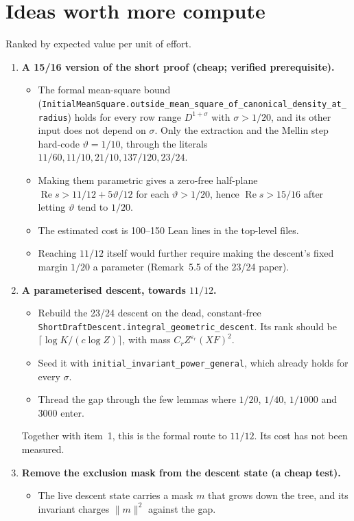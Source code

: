 \documentclass[11pt,a4paper]{article}
\newcommand{\lean}[1]{\nolinkurl{#1}}
\newcommand{\Rea}{\operatorname{Re}}
\begin{document}
\section{Ideas worth more compute}\label{sec:leads}
Ranked by expected value per unit of effort.
\begin{enumerate}
\item \textbf{A 15/16 version of the short proof (cheap; verified prerequisite).}
\begin{itemize}
\item The formal mean-square bound
(\lean{InitialMeanSquare.outside_mean_square_of_canonical_density_at_radius}) holds for every row
range $D^{1+\sigma}$ with $\sigma>1/20$, and its other input does not depend on $\sigma$. Only the
extraction and the Mellin step hard-code $\vartheta=1/10$, through the literals
$11/60, 11/10, 21/10, 137/120, 23/24$.
\item Making them parametric gives a zero-free half-plane $\Rea s>11/12+5\vartheta/12$ for each
$\vartheta>1/20$, hence $\Rea s>15/16$ after letting $\vartheta$ tend to $1/20$.
\item The estimated cost is 100--150 Lean lines in the top-level files.
\item Reaching $11/12$ itself would further require making the descent's fixed margin $1/20$ a
parameter (Remark~5.5 of the 23/24 paper).
\end{itemize}
\item \textbf{A parameterised descent, towards $11/12$.}
\begin{itemize}
\item Rebuild the 23/24 descent on the dead, constant-free
\lean{ShortDraftDescent.integral_geometric_descent}. Its rank should be
$\lceil\log K/(c\log Z)\rceil$, with mass $C_rZ^{\varepsilon_r}(XF)^2$.
\item Seed it with \lean{initial_invariant_power_general}, which already holds for every $\sigma$.
\item Thread the gap through the few lemmas where $1/20$, $1/40$, $1/1000$ and $3000$ enter.
\end{itemize}
Together with item~1, this is the formal route to $11/12$. Its cost has not been measured.
\item \textbf{Remove the exclusion mask from the descent state (a cheap test).}
\begin{itemize}
\item The live descent state carries a mask $m$ that grows down the tree, and its invariant charges
$\|m\|^2$ against the gap.

\end{itemize}
\end{enumerate}
\end{document}
